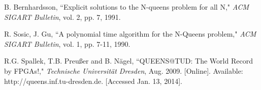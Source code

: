 \documentclass[conference]{IEEEtran}
\begin{document}
\begin{thebibliography}{24}
 B. Bernhardsson, ``Explicit solutions to the N-queens problem for all N,"
        {\it ACM SIGART Bulletin}, vol. 2, pp. 7, 1991.

 R. Sosic, J. Gu, ``A polynomial time algorithm for the N-Queens problem,"
        {\it ACM SIGART Bulletin}, vol. 1, pp. 7-11, 1990.

 R.G. Spallek, T.B. Preu{\ss}er and B. N{\"a}gel, ``QUEENS@TUD: The World Record by FPGAs!,"
        {\it Technische Universit{\"a}t Dresden}, Aug. 2009. [Online]. Available: http://queens.inf.tu-dresden.de. [Accessed Jan. 13, 2014].

\end{thebibliography}

\end{document}
